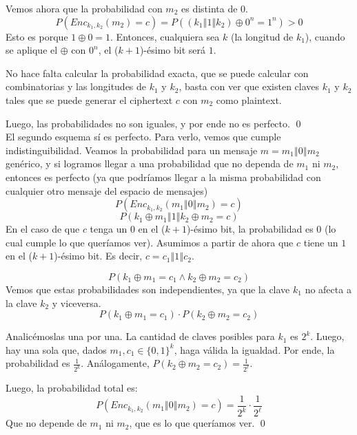 \documentclass[12pt,addpoints,answers]{exam}
\begin{document}
\begin{questions}
\begin{solution}
    Vemos ahora que la probabilidad con $m_2$ es distinta de 0.
    \[
        P(Enc_{k_1,k_2}(m_2) = c) = P((k_1 \mathbin\Vert 1 \mathbin\Vert k_2) \oplus 0^n = 1^n) > 0
    \]
    Esto es porque $1 \oplus 0 = 1$. Entonces, cualquiera sea $k$ (la longitud de $k_1$), cuando se aplique el $\oplus$ con $0^n$, el ($k+1$)-ésimo bit será $1$. 
    
    No hace falta calcular la probabilidad exacta, que se puede calcular con combinatorias y las longitudes de $k_1$ y $k_2$, basta con ver que existen claves $k_1$ y $k_2$ tales que se puede generar el ciphertext $c$ con $m_2$ como plaintext. 

    Luego, las probabilidades no son iguales, y por ende no es perfecto.
    \qed \\


    El segundo esquema sí es perfecto. Para verlo, vemos que cumple indistinguibilidad. Veamos la probabilidad para un mensaje $m = m_1 \mathbin\Vert 0 \mathbin\Vert m_2$ genérico, y si logramos llegar a una probabilidad que no dependa de $m_1$ ni $m_2$, entonces es perfecto (ya que podríamos llegar a la misma probabilidad con cualquier otro mensaje del espacio de mensajes)
    \[
        P(Enc_{k_1,k_2}(m_1 \mathbin\Vert 0 \mathbin\Vert m_2) = c) 
    \]
    \[
        P(k_1 \oplus m_1 \mathbin\Vert 1 \mathbin\Vert k_2 \oplus m_2 = c)
    \]
    En el caso de que $c$ tenga un $0$ en el ($k+1$)-ésimo bit, la probabilidad es 0 (lo cual cumple lo que queríamos ver). Asumimos a partir de ahora que $c$ tiene un $1$ en el ($k+1$)-ésimo bit. Es decir, $c = c_1 \mathbin\Vert 1 \mathbin\Vert c_2$.

    \[
        P(k_1 \oplus m_1 = c_1 \land k_2 \oplus m_2 = c_2)
    \]
    Vemos que estas probabilidades son independientes, ya que la clave $k_1$ no afecta a la clave $k_2$ y viceversa.
    \[
        P(k_1 \oplus m_1 = c_1) \cdot P(k_2 \oplus m_2 = c_2)
    \]

    Analicémoslas una por una. La cantidad de claves posibles para $k_1$ es $2^k$. Luego, hay una sola que, dados $m_1, c_1 \in \{0,1\}^k$, haga válida la igualdad. Por ende, la probabilidad es $\frac{1}{2^k}$. Análogamente, $P(k_2 \oplus m_2 = c_2) = \frac{1}{2^\ell}$.

    Luego, la probabilidad total es:
    \[
        P(Enc_{k_1,k_2}(m_1 \mathbin\Vert 0 \mathbin\Vert m_2) = c) = \frac{1}{2^k} \cdot \frac{1}{2^\ell}
    \]
    Que no depende de $m_1$ ni $m_2$, que es lo que queríamos ver. 
    \qed




\end{solution}
\end{questions}
\end{document}
